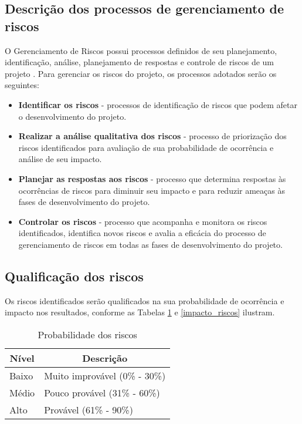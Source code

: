   \subsection*{Descrição dos processos de gerenciamento de riscos}

O Gerenciamento de Riscos possui processos definidos de seu planejamento, identificação, análise, planejamento de respostas e controle de riscos de um projeto \cite{pmbok}.
Para gerenciar os riscos do projeto, os processos adotados serão os seguintes:

\begin{itemize}
  \item \textbf{Identificar os riscos} - processos de identificação de riscos que podem afetar o desenvolvimento do projeto.
  \item \textbf{Realizar a análise qualitativa dos riscos} - processo de priorização dos riscos identificados para avaliação de sua probabilidade de ocorrência e análise de seu impacto.
  \item \textbf{Planejar as respostas aos riscos} - processo que determina respostas às ocorrências de riscos para diminuir seu impacto e para reduzir ameaças às fases de desenvolvimento do projeto.
  \item \textbf{Controlar os riscos} - processo que acompanha e monitora os riscos identificados, identifica novos riscos e avalia a eficácia do processo de gerenciamento de riscos em todas as fases de desenvolvimento do projeto.
\end{itemize}


\subsection*{Qualificação dos riscos}
Os riscos identificados serão qualificados na sua probabilidade de ocorrência e impacto nos resultados, conforme as Tabelas \ref{probabilidade_riscos} e \ref{impacto_riscos} ilustram.

\begin{table}[h]
\centering
\caption{Probabilidade dos riscos}
\label{probabilidade_riscos}
\begin{tabular}{|l|l|}
\hline
\multicolumn{1}{|c|}{\textbf{Nível}} & \multicolumn{1}{c|}{\textbf{Descrição}} \\ \hline
Baixo                                & Muito improvável (0\% - 30\%)       \\ \hline
Médio                                & Pouco provável (31\% - 60\%)            \\ \hline
Alto                                 & Provável (61\% - 90\%)                  \\ \hline
\end{tabular}
\end{table}


